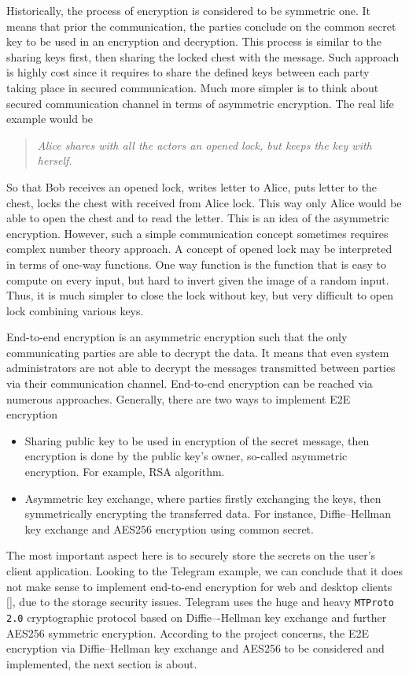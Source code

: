 Historically, the process of encryption is considered to be symmetric one.
It means that prior the communication, the parties conclude on the common secret key to be used in
an encryption and decryption.
This process is similar to the sharing keys first, then sharing the locked chest with the message.
Such approach is highly cost since it requires to share the defined keys between each party taking place in
secured communication.
Much more simpler is to think about secured communication channel in terms of asymmetric encryption.
The real life example would be
\begin{center}
    \begin{quote}
        \textit{Alice shares with all the actors an opened lock, but keeps the key with herself.}
    \end{quote}
\end{center}
So that Bob receives an opened lock, writes letter to Alice, puts letter to the chest, locks the chest with received
from Alice lock.
This way only Alice would be able to open the chest and to read the letter.
This is an idea of the asymmetric encryption.
However, such a simple communication concept sometimes requires complex number theory approach.
A concept of opened lock may be interpreted in terms of one-way functions.
One way function is the function that is easy to compute on every input, but hard to invert given the image of
a random input.
Thus, it is much simpler to close the lock without key, but very difficult to open lock combining various
keys.

End-to-end encryption is an asymmetric encryption such that the only communicating parties are able to decrypt the data.
It means that even system administrators are not able to decrypt the messages transmitted between parties
via their communication channel.
End-to-end encryption can be reached via numerous approaches.
Generally, there are two ways to implement E2E encryption
\begin{itemize}
    \item Sharing public key to be used in encryption of the secret message, then encryption is done by the
    public key's owner, so-called asymmetric encryption.
    For example, RSA algorithm.
    \item Asymmetric key exchange, where parties firstly exchanging the keys, then symmetrically encrypting
    the transferred data.
    For instance, Diffie--Hellman key exchange and AES256 encryption using common secret.
\end{itemize}
The most important aspect here is to securely store the secrets on the user's client application.
Looking to the Telegram example, we can conclude that it does not make sense to implement end-to-end encryption for web
and desktop clients [\cite{job2015modified,suvsanka2017security,lee2017security}], due to the storage security issues.
Telegram uses the huge and heavy \texttt{MTProto 2.0} cryptographic protocol based on Diffie–-Hellman key exchange and
further AES256 symmetric encryption.
According to the project concerns, the E2E encryption via Diffie--Hellman key exchange and AES256
to be considered and implemented, the next section is about.

